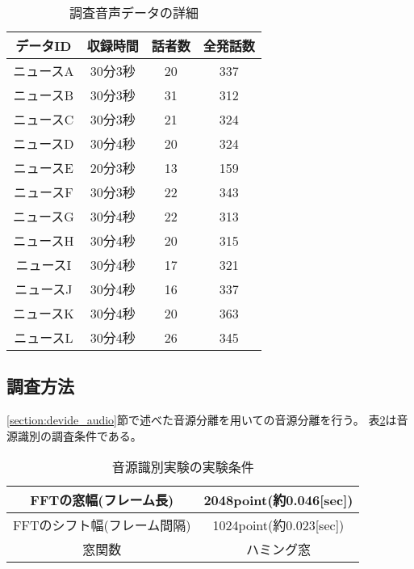 \begin{table}[H]
  \begin{center}
    \caption{調査音声データの詳細　\label{table:train_detail}}
    \begin{tabular}{|c||c|c|c|} \hline
      データID & 収録時間 & 話者数 & 全発話数 \\ \hline
      ニュースA & 30分3秒 & 20 & 337 \\ \hline
      ニュースB & 30分3秒 & 31 & 312\\ \hline
      ニュースC & 30分3秒 & 21 & 324 \\ \hline
      ニュースD & 30分4秒 & 20 & 324\\ \hline
      ニュースE & 20分3秒 & 13 & 159\\ \hline
      ニュースF & 30分3秒 & 22 & 343\\ \hline
      ニュースG & 30分4秒 & 22 & 313\\ \hline
      ニュースH & 30分4秒 & 20 & 315\\ \hline
      ニュースI & 30分4秒 & 17 & 321\\ \hline
      ニュースJ & 30分4秒 & 16 & 337\\ \hline
      ニュースK & 30分4秒 & 20 & 363\\ \hline
      ニュースL & 30分4秒 & 26 & 345\\ \hline
    \end{tabular}
  \end{center}
\end{table}

\subsection{調査方法}
\ref{section:devide_audio}節で述べた音源分離を用いての音源分離を行う。
表\ref{table:detail_identification_method1}は音源識別の調査条件である。

\begin{table}[H]
  \begin{center}
    \caption{音源識別実験の実験条件 \label{table:detail_identification_method1}}
    \begin{tabular}{|c||c|} \hline
      FFTの窓幅(フレーム長) & 2048point(約0.046[sec])   \\ \hline
      FFTのシフト幅(フレーム間隔) &  1024point(約0.023[sec]) \\ \hline
      窓関数 & ハミング窓  \\ \hline
    \end{tabular}
  \end{center}
\end{table}

